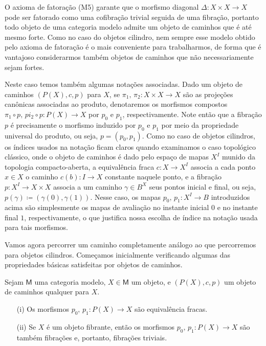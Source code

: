 \begin{obs}
  O axioma de fatoração (M5) garante que o morfismo diagonal $\Delta: X \times X \to X$ pode ser fatorado como uma cofibração trivial seguida de uma fibração, portanto todo objeto de uma categoria modelo admite um objeto de caminhos que é até mesmo forte.
  Como no caso do objetos cilindro, nem sempre esse modelo obtido pelo axioma de fatoração é o mais conveniente para trabalharmos, de forma que é vantajoso considerarmos também objetos de caminhos que não necessariamente sejam fortes.
\end{obs}

Neste caso temos também algumas notações associadas.
Dado um objeto de caminhos $(P(X),c,p)$ para $X$, se $\pi_{1},\,\pi_{2}: X \times X \to X$ são as projeções canônicas associadas ao produto, denotaremos os morfismos compostos $\pi_{1} \circ p,\,pi_{2} \circ p: P(X) \to X$ por $p_{0}$ e $p_{1}$, respectivamente.
Note então que a fibração $p$ é precisamente o morfismo induzido por $p_{0}$ e $p_{1}$ por meio da propriedade universal do produto, ou seja, $p = (p_{0},p_{1})$.
Como no caso de objetos cilindros, os índices usados na notação ficam claros quando examinamos o caso topológico clássico, onde o objeto de caminhos é dado pelo espaço de mapas $X^{I}$ munido da topologia compacto-aberta, a equivalência fraca $c: X \to X^{I}$ associa a cada ponto $x \in X$ o caminho $c(b): I \to X$ constante naquele ponto, e a fibração $p: X^{I} \to X \times X$ associa a um caminho $\gamma \in B^{X}$ seus pontos inicial e final, ou seja, $p(\gamma) \coloneqq (\gamma(0),\gamma(1))$.
Nesse caso, os mapas $p_{0},\,p_{1}: X^{I} \to B$ introduzidos acima são simplesmente os mapas de avaliação no instante inicial $0$ e no instante final $1$, respectivamente, o que justifica nossa escolha de índice na notação usada para tais morfismos.

Vamos agora percorrer um caminho completamente análogo ao que percorremos para objetos cilindros.
Começamos inicialmente verificando algumas das propriedades básicas satisfeitas por objetos de caminhos.

\begin{lema}\label{lema:props_obj_de_caminhos}
  Sejam $\mathsf{M}$ uma categoria modelo, $X \in \mathsf{M}$ um objeto, e $(P(X),c,p)$ um objeto de caminhos qualquer para $X$.
  \begin{enumerate}
  \item[(i)] Os morfismos $p_{0},\, p_{1}: P(X) \to X$ são equivalência fracas.
    
  \item[(ii)] Se $X$ é um objeto fibrante, então os morfismos $p_{0},\, p_{1}: P(X) \to X$ são também fibrações e, portanto, fibrações triviais.
  \end{enumerate}
\end{lema}


